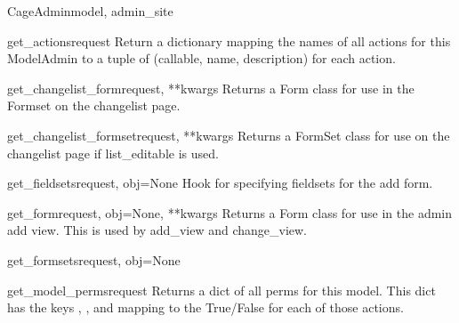 \documentclass[letterpaper,10pt,english]{sphinxmanual}
\begin{document}
\begin{classdesc}{CageAdmin}{model, admin\_site}
\hypertarget{animal.admin.CageAdmin.get_actions}{}\begin{methoddesc}{get\_actions}{request}
Return a dictionary mapping the names of all actions for this
ModelAdmin to a tuple of (callable, name, description) for each action.
\end{methoddesc}

\hypertarget{animal.admin.CageAdmin.get_changelist_form}{}\begin{methoddesc}{get\_changelist\_form}{request, **kwargs}
Returns a Form class for use in the Formset on the changelist page.
\end{methoddesc}

\hypertarget{animal.admin.CageAdmin.get_changelist_formset}{}\begin{methoddesc}{get\_changelist\_formset}{request, **kwargs}
Returns a FormSet class for use on the changelist page if list\_editable
is used.
\end{methoddesc}

\hypertarget{animal.admin.CageAdmin.get_fieldsets}{}\begin{methoddesc}{get\_fieldsets}{request, obj=None}
Hook for specifying fieldsets for the add form.
\end{methoddesc}

\hypertarget{animal.admin.CageAdmin.get_form}{}\begin{methoddesc}{get\_form}{request, obj=None, **kwargs}
Returns a Form class for use in the admin add view. This is used by
add\_view and change\_view.
\end{methoddesc}

\hypertarget{animal.admin.CageAdmin.get_formsets}{}\begin{methoddesc}{get\_formsets}{request, obj=None}\end{methoddesc}

\hypertarget{animal.admin.CageAdmin.get_model_perms}{}\begin{methoddesc}{get\_model\_perms}{request}
Returns a dict of all perms for this model. This dict has the keys
, , and  mapping to the True/False for each
of those actions.
\end{methoddesc}


\end{classdesc}
\end{document}
